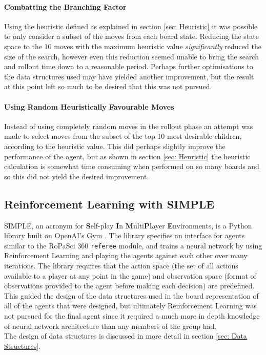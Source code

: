 \documentclass{article}
\begin{document}
\paragraph{Combatting the Branching Factor}
Using the heuristic defined as explained in section \ref{sec: Heuristic} it was possible to only consider a subset of the moves from each board state. Reducing the state space to the 10 moves with the maximum heuristic value \textit{significantly} reduced the size of the search, however even this reduction seemed unable to bring the search and rollout time down to a reasonable period. Perhaps further optimisations to the data structures used may have yielded another improvement, but the result at this point left so much to be desired that this was not pursued.
\paragraph{Using Random Heuristically Favourable Moves}
Instead of using completely random moves in the rollout phase an attempt was made to select moves from the subset of the top 10 most desirable children, according to the heuristic value. This did perhaps slightly improve the performance of the agent, but as shown in section \ref{sec: Heuristic} the heuristic calculation is somewhat time consuming when performed on so many boards and so this did not yield the desired improvement.

\subsection{Reinforcement Learning with SIMPLE \cite{SIMPLE}}
SIMPLE, an acronym for \textbf{S}elf-play \textbf{I}n \textbf{M}ulti\textbf{Pl}ayer \textbf{E}nvironments, is a Python library built on OpenAI's Gym \cite{brockman2016openai}. The library specifies an interface for agents similar to the RoPaSci 360 \verb|referee| module, and trains a neural network by using Reinforcement Learning and playing the agents against each other over many iterations. The library requires that the action space (the set of all actions available to a player at any point in the game) and observation space (format of observations provided to the agent before making each decision) are predefined. This guided the design of the data structures used in the board representation of all of the agents that were designed, but ultimately Reinforcement Learning was not pursued for the final agent since it required a much more in depth knowledge of neural network architecture than any members of the group had.\\[2mm]
The design of data structures is discussed in more detail in section \ref{sec: Data Structures}.
\end{document}
